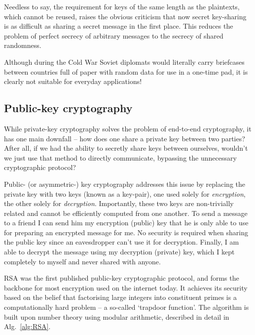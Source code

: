 Needless to say, the requirement for keys of the same length as the plaintexts, which cannot be reused, raises the obvious criticism that now secret key-sharing is as difficult as sharing a secret message in the first place. This reduces the problem of perfect secrecy of arbitrary messages to the secrecy of shared randomness. 

Although during the Cold War Soviet diplomats would literally carry briefcases between countries full of paper with random data for use in a one-time pad, it is clearly not suitable for everyday applications!

%
%

\subsection{Public-key cryptography}

While private-key cryptography solves the problem of end-to-end cryptography, it has one main downfall -- how does one share a private key between two parties? After all, if we had the ability to secretly share keys between ourselves, wouldn't we just use that method to directly communicate, bypassing the unnecessary cryptographic protocol?

Public- (or asymmetric-) key cryptography addresses this issue by replacing the private key with two keys (known as a key-pair), one used solely for \textit{encryption}, the other solely for \textit{decryption}. Importantly, these two keys are non-trivially related and cannot be efficiently computed from one another. To send a message to a friend I can send him my encryption (public) key that he is only able to use for preparing an encrypted message for me. No security is required when sharing the public key since an eavesdropper can't use it for decryption. Finally, I am able to decrypt the message using my decryption (private) key, which I kept completely to myself and never shared with anyone.

RSA \cite{bib:RSA} was the first published public-key cryptographic protocol, and forms the backbone for most encryption used on the internet today. It achieves its security based on the belief that factorising large integers into constituent primes is a computationally hard problem -- a so-called `trapdoor function'. The algorithm is built upon number theory using modular arithmetic, described in detail in Alg.~\ref{alg:RSA}.

